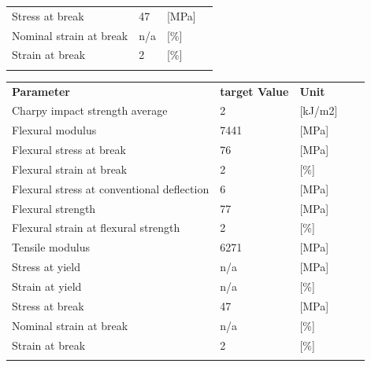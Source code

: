 \documentclass{article}
\begin{document}
\begin{center}
\begin{paracol}{2}
\begin{tabularx}{0.5\textwidth}{ X l l l}
			Stress at break                            & 47                   & [MPa]         &\\
			\arrayrulecolor{line_color}\hline
			Nominal strain at break                    & n/a                  & [\%]          &\\
			\arrayrulecolor{line_color}\hline
			Strain at break                            & 2                    & [\%]          &\\
			\arrayrulecolor{line_color}\hline
		\end{tabularx}
		\switchcolumn
		\begin{tabularx}{0.5\textwidth}{ X l l l l }
			\textbf{Parameter}                         & \textbf{target Value}& \textbf{Unit} &\\
			\arrayrulecolor{line_color}\hline
			Charpy impact strength average             & 2                    & [kJ/m2]       &\\
			\arrayrulecolor{line_color}\hline
			Flexural modulus                           & 7441                 & [MPa]         &\\
			\arrayrulecolor{line_color}\hline
			Flexural stress at break                   & 76                   & [MPa]         &\\
			\arrayrulecolor{line_color}\hline
			Flexural strain at break                   & 2                    & [\%]          &\\
			\arrayrulecolor{line_color}\hline
			Flexural stress at conventional deflection & 6                    & [MPa]         &\\
			\arrayrulecolor{line_color}\hline
			Flexural strength                          & 77                   & [MPa]         &\\
			\arrayrulecolor{line_color}\hline
			Flexural strain at flexural strength       & 2                    & [\%]          &\\
			\arrayrulecolor{line_color}\hline
			Tensile modulus                            & 6271                 & [MPa]         &\\
			\arrayrulecolor{line_color}\hline
			Stress at yield                            & n/a                  & [MPa]         &\\
			\arrayrulecolor{line_color}\hline
			Strain at yield                            & n/a                  & [\%]          &\\
			\arrayrulecolor{line_color}\hline
			Stress at break                            & 47                   & [MPa]         &\\
			\arrayrulecolor{line_color}\hline
			Nominal strain at break                    & n/a                  & [\%]          &\\
			\arrayrulecolor{line_color}\hline
			Strain at break                            & 2                    & [\%]          &\\
			\arrayrulecolor{line_color}\hline
		\end{tabularx}
	\end{paracol}
\end{center}
\end{document}
